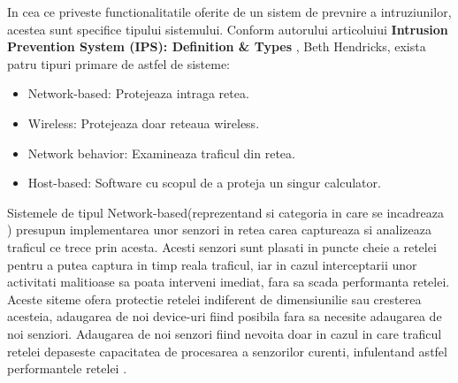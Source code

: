In cea ce priveste functionalitatile oferite de un sistem de prevnire a intruziunilor, acestea sunt specifice tipului sistemului. Conform autorului articoluiui \textbf{Intrusion Prevention System (IPS): Definition \& Types} \cite{ips_types}, Beth Hendricks, exista patru tipuri primare de astfel de sisteme:
\begin{itemize}
	\item Network-based: Protejeaza intraga retea.
	\item Wireless: Protejeaza doar reteaua wireless.
	\item Network behavior: Examineaza traficul din retea.
	\item Host-based: Software cu scopul de a proteja un singur calculator.
\end{itemize}

Sistemele de tipul Network-based(reprezentand si categoria in care se incadreaza  \textit{\thesistitle}) presupun implementarea unor senzori in retea carea captureaza si analizeaza traficul ce trece prin acesta. Acesti senzori sunt plasati in puncte cheie a retelei pentru a putea captura in timp reala traficul, iar in cazul interceptarii unor activitati malitioase sa poata interveni imediat, fara sa scada performanta retelei. Aceste siteme ofera protectie retelei indiferent de dimensiunilie sau cresterea acesteia, adaugarea de noi device-uri fiind posibila fara sa necesite adaugarea de noi senziori. Adaugarea de noi senzori fiind nevoita doar in cazul in care traficul retelei depaseste capacitatea de procesarea a senzorilor curenti, infulentand astfel performantele retelei \cite{impl}.

